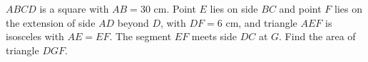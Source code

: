 $ABCD$ is a square with $AB=30$ cm. Point $E$ lies on side $BC$ and point $F$ lies on the extension of side $AD$ beyond $D$, with $DF=6$ cm, and triangle $AEF$ is isosceles with $AE=EF$. The segment $EF$ meets side $DC$ at $G$. Find the area of triangle $DGF$.
